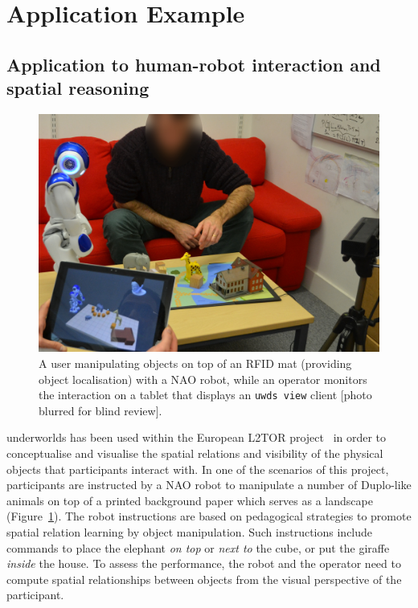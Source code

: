 \documentclass[letterpaper, 10pt, conference]{ieeeconf}
\newcommand{\uwds}{{\sc underworlds}\xspace}
\begin{document}
\section{Application Example}
\label{application}

\subsection{Application to human-robot interaction and spatial reasoning}

\begin{figure}
    \centering
    \includegraphics[width=\linewidth]{l2tor-photo2-blind}
    \caption{A user manipulating objects on top of an RFID mat (providing object
    localisation) with a NAO robot, while an operator monitors
    the interaction on a tablet that displays an {\tt uwds view} client [photo blurred for blind review].}

    \label{fig|l2torexample}
\end{figure}

\uwds has been used within the European L2TOR project~\cite{belpaeme2015l2tor}
in order to conceptualise and visualise the spatial relations and visibility of
the physical objects that participants interact with. In one of the scenarios of this
project, participants are instructed by a NAO robot to manipulate a number of
Duplo-like animals on top of a printed background paper which serves as a
landscape (Figure~\ref{fig|l2torexample}). The robot instructions are based on
pedagogical strategies to promote spatial relation learning by object
manipulation. Such instructions include commands to place the elephant
\textit{on top} or \textit{next to} the cube, or put the giraffe \textit{inside}
the house.  To assess the performance, the robot and the operator need to
compute spatial relationships between objects from the visual perspective of the
participant.
\end{document}
